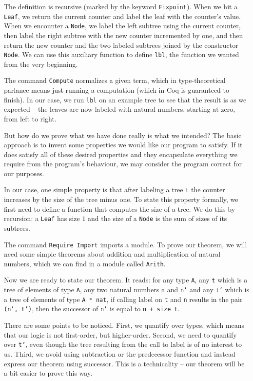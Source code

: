 \documentclass[declaration,inz,english,shortabstract]{iithesis}
\newcommand{\m}[1]{\texttt{#1}}
\begin{document}
The definition is recursive (marked by the keyword \m{Fixpoint}). When we hit a \m{Leaf}, we return the current counter and label the leaf with the counter's value. When we encounter a \m{Node}, we label the left subtree using the current counter, then label the right subtree with the new counter incremented by one, and then return the new counter and the two labeled subtrees joined by the constructor \m{Node}. We can use this auxiliary function to define \m{lbl}, the function we wanted from the very beginning.

The command \m{Compute} normalizes a given term, which in type-theoretical parlance means just running a computation (which in Coq is guaranteed to finish). In our case, we run \m{lbl} on an example tree to see that the result is as we expected -- the leaves are now labeled with natural numbers, starting at zero, from left to right.

But how do we prove what we have done really is what we intended? The basic approach is to invent some properties we would like our program to satisfy. If it does satisfy all of these desired properties and they encapsulate everything we require from the program's behaviour, we may consider the program correct for our purposes.

In our case, one simple property is that after labeling a tree \m{t} the counter increases by the size of the tree minus one. To state this property formally, we first need to define a function that computes the size of a tree. We do this by recursion: a \m{Leaf} has size $1$ and the size of a \m{Node} is the sum of sizes of its subtrees.

The command \m{Require Import} imports a module. To prove our theorem, we will need some simple theorems about addition and multiplication of natural numbers, which we can find in a module called \m{Arith}.

Now we are ready to state our theorem. It reads: for any type \m{A}, any \m{t} which is a tree of elements of type \m{A}, any two natural numbers \m{n} and \m{n'} and any \m{t'} which is a tree of elements of type \m{A * nat}, if calling label on \m{t} and \m{n} results in the pair \m{(n', t')}, then the successor of \m{n'} is equal to \m{n + size\ t}.

There are some points to be noticed. First, we quantify over types, which means that our logic is not first-order, but higher-order. Second, we need to quantify over \m{t'}, even though the tree resulting from the call to label is of no interest to us. Third, we avoid using subtraction or the predecessor function and instead express our theorem using successor. This is a technicality -- our theorem will be a bit easier to prove this way.
\end{document}
